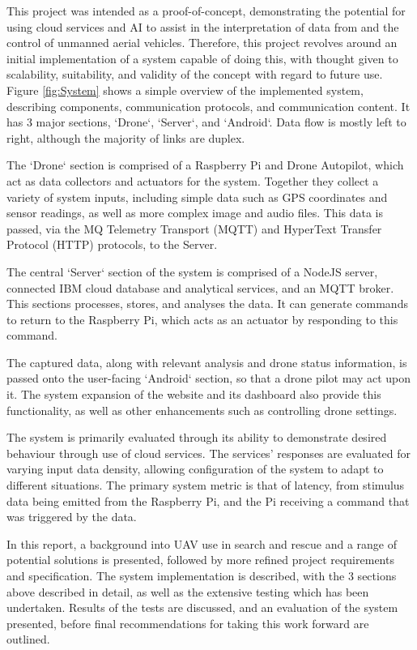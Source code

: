 \documentclass{article}
\begin{document}
This project was intended as a proof-of-concept, demonstrating the potential for using cloud services and AI to assist in the interpretation of data from and the control of unmanned aerial vehicles. Therefore, this project revolves around an initial implementation of a system capable of doing this, with thought given to scalability, suitability, and validity of the concept with regard to future use. Figure \ref{fig:System} shows a simple overview of the implemented system, describing components, communication protocols, and communication content. It has 3 major sections, `Drone`, `Server`, and `Android`. Data flow is mostly left to right, although the majority of links are duplex. 

The `Drone` section is comprised of a Raspberry Pi and Drone Autopilot, which act as data collectors and actuators for the system. Together they collect a variety of system inputs, including simple data such as GPS coordinates and sensor readings, as well as more complex image and audio files. This data is passed, via the MQ Telemetry Transport (MQTT) and HyperText Transfer Protocol (HTTP) protocols, to the Server. 

The central `Server` section of the system is comprised of a NodeJS server, connected IBM cloud database and analytical services, and an MQTT broker. This sections processes, stores, and analyses the data. It can generate commands to return to the Raspberry Pi, which acts as an actuator by responding to this command. 

The captured data, along with relevant analysis and drone status information, is passed onto the user-facing `Android` section, so that a drone pilot may act upon it. The system expansion of the website and its dashboard also provide this functionality, as well as other enhancements such as controlling drone settings.

The system is primarily evaluated through its ability to demonstrate desired behaviour through use of cloud services. The services' responses are evaluated for varying input data density, allowing configuration of the system to adapt to different situations. The primary system metric is that of latency, from stimulus data being emitted from the Raspberry Pi, and the Pi receiving a command that was triggered by the data. 

In this report, a background into UAV use in search and rescue and a range of potential solutions is presented, followed by more refined project requirements and specification. The system implementation is described, with the 3 sections above described in detail, as well as the extensive testing which has been undertaken. Results of the tests are discussed, and an evaluation of the system presented, before final recommendations for taking this work forward are outlined.
\end{document}
